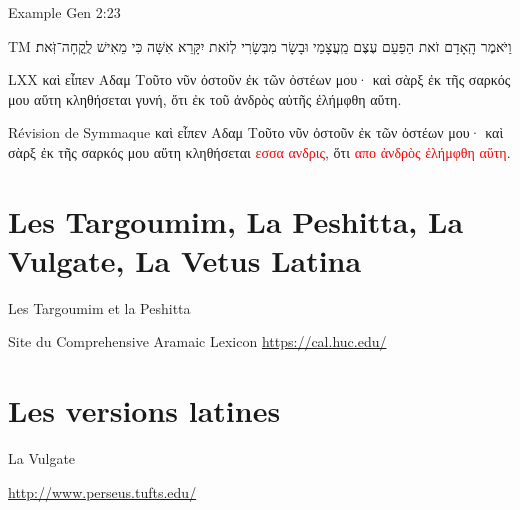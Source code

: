 \documentclass[11pt]{beamer}
\begin{document}
\begin{frame}{Example Gen 2:23}
\begin{block}{TM}
    \texthebrew{וַיֹּאמֶר הָֽאָדָם זֹאת הַפַּעַם עֶצֶם מֵֽעֲצָמַי וּבָשָׂר מִבְּשָׂרִי לְזֹאת יִקָּרֵא אִשָּׁה כִּי מֵאִישׁ לֻֽקֳחָה־זֹּֽאת׃}
\end{block}
\begin{block}{LXX}
    \textgreek{καὶ εἶπεν Αδαμ Τοῦτο νῦν ὀστοῦν ἐκ τῶν ὀστέων μου· καὶ σὰρξ ἐκ τῆς σαρκός μου αὕτη κληθήσεται γυνή, ὅτι ἐκ τοῦ ἀνδρὸς αὐτῆς ἐλήμφθη αὕτη.}
\end{block}
\begin{block}{Révision de Symmaque}
    \textgreek{καὶ εἶπεν Αδαμ Τοῦτο νῦν ὀστοῦν ἐκ τῶν ὀστέων μου· καὶ σὰρξ ἐκ τῆς σαρκός μου αὕτη κληθήσεται \textcolor{red}{εσσα ανδρις}, ὅτι \textcolor{red}{απο ἀνδρὸς ἐλήμφθη αὕτη}.}
\end{block}
    
\end{frame}



\section{Les Targoumim, La Peshitta, La Vulgate, La Vetus Latina}
\begin{frame}{Les Targoumim et la Peshitta}
\begin{block}{Site du Comprehensive Aramaic Lexicon}
    \href{https://cal.huc.edu/}{https://cal.huc.edu/}
\end{block}
\end{frame}

\section{Les versions latines}
\begin{frame}{La Vulgate}
 \begin{block}{}
 \href{http://www.perseus.tufts.edu/hopper/text?doc=urn:cts:greekLit:tlg0527.tlg001.perseus-lat1}{http://www.perseus.tufts.edu/}

 \end{block}
\end{frame}
\end{document}
